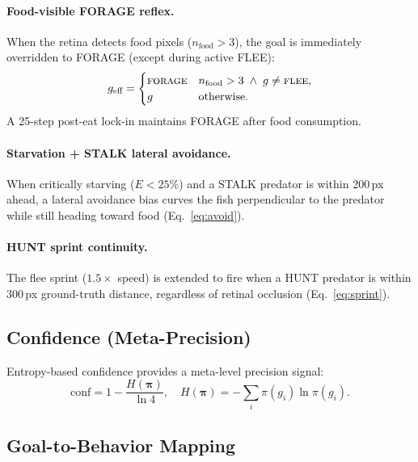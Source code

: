 \documentclass[11pt,a4paper]{article}
\begin{document}
\paragraph{Food-visible FORAGE reflex.}
When the retina detects food pixels ($n_\text{food} > 3$), the goal is
immediately overridden to FORAGE (except during active FLEE):
\[
  g_\text{eff} = \begin{cases}
    \textsc{forage} & n_\text{food} > 3 \;\wedge\; g \neq \textsc{flee}, \\
    g               & \text{otherwise.}
  \end{cases}
\]
A 25-step post-eat lock-in maintains FORAGE after food consumption.

\paragraph{Starvation + STALK lateral avoidance.}
When critically starving ($E < 25\%$) and a STALK predator is within
200\,px ahead, a lateral avoidance bias curves the fish perpendicular
to the predator while still heading toward food (Eq.~\ref{eq:avoid}).

\paragraph{HUNT sprint continuity.}
The flee sprint ($1.5\times$ speed) is extended to fire when a HUNT
predator is within 300\,px ground-truth distance, regardless of
retinal occlusion (Eq.~\ref{eq:sprint}).

\subsection{Confidence (Meta-Precision)}

Entropy-based confidence provides a meta-level precision signal:
\begin{equation}\label{eq:confidence}
  \text{conf} = 1 - \frac{H(\boldsymbol{\pi})}{\ln 4},
  \quad
  H(\boldsymbol{\pi}) = -\sum_i \pi(g_i)\ln\pi(g_i).
\end{equation}

\subsection{Goal-to-Behavior Mapping}
\end{document}
